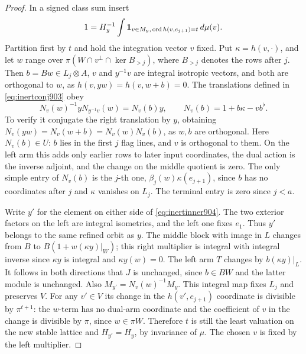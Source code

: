 \documentclass[a4paper,11pt]{article}
\theoremstyle{definition}
\theoremstyle{remark}
\numberwithin{equation}{section}
\begin{document}
\begin{proof}
In a signed class sum insert
\[
            1=H_y^{-1}\int {\bf1}_{v\in M_y,\,
                   \operatorname{ord}h(v,e_{j+1})=t}\,d\mu(v).
\]
Partition first by \(t\) and hold the integration vector \(v\)
fixed. Put \(\kappa=h(v,\cdot)\), and let \(w\) range over
\(\pi(W\cap v^\perp\cap\ker B_{>j})\), where \(B_{>j}\) denotes
the rows after \(j\). Then \(b=Bw\in L_j\otimes A\), \(v\)
and \(y^{-1}v\) are integral isotropic vectors, and both are
orthogonal to \(w\), as \(h(v,yw)=h(v,w+b)=0\).
The translations defined in \eqref{eq:inertconj903} obey
\begin{equation}
       N_v(w)^{-1}yN_{y^{-1}v}(w)=N_v(b)y,\qquad
                     N_v(b)=1+b\kappa-vb^\flat .
 \label{eq:inertinner904}
\end{equation}
To verify it conjugate the right translation by \(y\), obtaining
\(N_v(yw)=N_v(w+b)=N_v(w)N_v(b)\), as \(w,b\) are orthogonal.
Here \(N_v(b)\in U\): \(b\) lies in the first \(j\) flag lines,
and \(v\) is orthogonal to them. On the left arm this adds only
earlier rows to later input coordinates, the dual action is the
inverse adjoint, and the change on the middle quotient is zero.
The only simple entry of \(N_v(b)\) is the \(j\)-th one,
\(\beta_j(w)\kappa(e_{j+1})\), since \(b\) has no coordinates
after \(j\) and \(\kappa\) vanishes on \(L_j\). The terminal
entry is zero since \(j<a\).

Write \(y'\) for the element on either side of
\eqref{eq:inertinner904}. The two exterior factors on the left
are integral isometries, and the left one fixes \(e_1\).
Thus \(y'\) belongs to the same refined orbit as \(y\).
The middle block with image in \(L\) changes from \(B\) to
\(B(1+w(\kappa y)|_W)\); this right multiplier is integral
with integral inverse since \(\kappa y\) is integral and
\(\kappa y(w)=0\). The left arm \(T\) changes by
\(b(\kappa y)|_L\). It follows in both directions that \(J\)
is unchanged, since \(b\in BW\) and the latter module is unchanged.
Also \(M_{y'}=N_v(w)^{-1}M_y\). This integral map fixes \(L_j\)
and preserves \(V\). For any \(v'\in V\) its change in the
\(h(v',e_{j+1})\) coordinate is divisible by \(\pi^{t+1}\):
the \(w\)-term has no dual-arm coordinate and the coefficient
of \(v\) in the change is divisible by \(\pi\), since
\(w\in\pi W\). Therefore \(t\) is still the least valuation
on the new stable lattice and \(H_{y'}=H_y\), by invariance of
\(\mu\). The chosen \(v\) is fixed by the left multiplier.


\end{proof}
\end{document}
